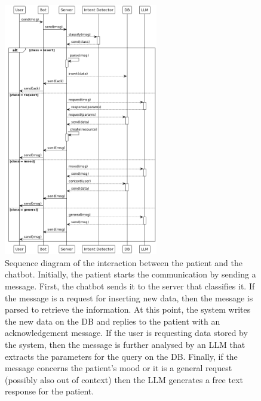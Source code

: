 \documentclass[preprint,12pt]{elsarticle}
\begin{document}
\begin{figure}[ht!]
	\centering
	\includegraphics[width=0.6\textwidth]{figures/sequence_diagram.png}
	\caption{
            Sequence diagram of the interaction between the patient and the chatbot. 
            Initially, the patient starts the communication by sending a message. 
            First, the chatbot sends it to the server that classifies it. 
            If the message is a request for inserting new data, then the message is parsed to retrieve the information. 
            At this point, the system writes the new data on the DB and replies to the patient with an acknowledgement message. 
            If the user is requesting data stored by the system, then the message is further analysed by an LLM that extracts the parameters for the query on the DB.
            Finally, if the message concerns the patient’s mood or it is a general request (possibly also out of context) then the LLM generates a free text response for the patient.
        }
	\label{fig:seq}
\end{figure}
\end{document}
